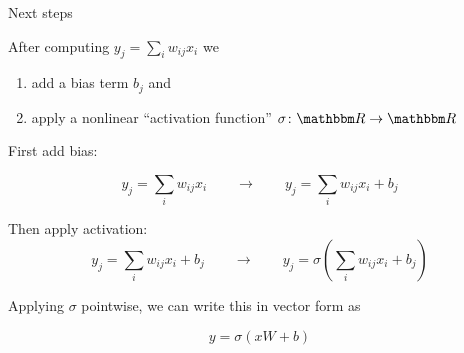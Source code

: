 \begin{frame}{Next steps}

        \vspace{0.5em}
        \vspace{0.5em}
    After computing $y_j = \sum_i w_{ij} x_i$ we 
    \begin{enumerate}
        \item add a bias term $b_j$ and
        \item apply a nonlinear ``activation function'' $\sigma \colon \RR \to \RR$
    \end{enumerate}
    

\end{frame}

\begin{frame}
    
    First add bias:

    \begin{equation*}
        y_j = \sum_i w_{ij} x_i       
        \qquad \to \qquad
        y_j = \sum_i w_{ij} x_i + b_j
    \end{equation*}

    Then apply activation:
    \begin{equation*}
        y_j = \sum_i w_{ij} x_i + b_j
        \qquad \to \qquad
        y_j = \sigma \left(\sum_i w_{ij} x_i + b_j \right)
    \end{equation*}

    Applying $\sigma$ pointwise, we can write this in vector form as
    
    \begin{equation*}
        y = \sigma(x W + b)
    \end{equation*}

    
\end{frame}

